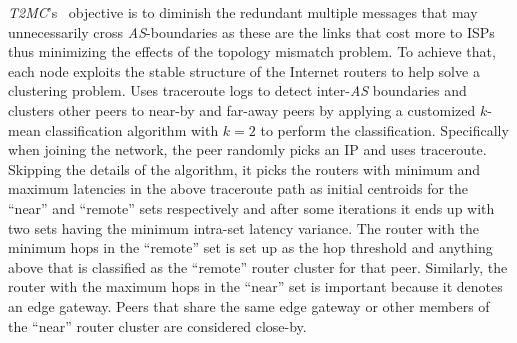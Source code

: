 \emph{T2MC}'s~\cite{SLCGZ2008} objective is to diminish the redundant multiple
messages that may unnecessarily cross \emph{AS}-boundaries as these are the
links that cost more to ISPs thus minimizing the effects of the topology
mismatch problem. To achieve that, each node exploits the stable structure of
the Internet routers to help solve a clustering problem. Uses traceroute
logs to detect inter-\emph{AS} boundaries and clusters other peers to near-by and
far-away peers by applying a customized $k$-mean classification
algorithm with $k = 2$ to perform the classification.
Specifically when joining the network, the peer randomly picks an IP and uses
traceroute. Skipping the details of the algorithm, it picks the routers with
minimum and maximum latencies in the above traceroute path as initial centroids
for the ``near'' and ``remote'' sets respectively and after some iterations it
ends up with two sets having the minimum intra-set latency variance. The
router with the minimum hops in the ``remote'' set is set up as the hop
threshold and anything above that is classified as the ``remote'' router cluster
for that peer. Similarly, the router with the maximum hops in the ``near'' set
is important because it denotes an edge gateway. Peers that share the same
edge gateway or other members of the ``near'' router cluster are considered
close-by.

